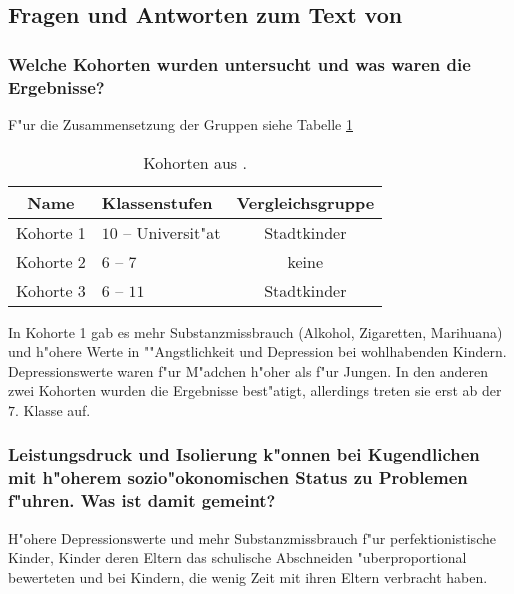 \subsection{Fragen und Antworten zum Text von \textcite{luthar_children_2005}}
\subsubsection{Welche Kohorten wurden untersucht und was waren die Ergebnisse?}

F"ur die Zusammensetzung der Gruppen siehe Tabelle \ref{tab:cohorts}
\begin{table}
        \centering
        \begin{tabular}{c | l | c}
                Name & Klassenstufen & Vergleichsgruppe\\
                \hline
                \hline
                Kohorte 1 & $10$ -- Universit"at & Stadtkinder\\
                Kohorte 2 & $6$ -- $7$ & keine \\
                Kohorte 3 & $6$ -- $11$ & Stadtkinder\\
                \hline
        \end{tabular}
        \caption{Kohorten aus \textcite{luthar_children_2005}.}
        \label{tab:cohorts}
\end{table}

In Kohorte 1 gab es mehr Substanzmissbrauch (Alkohol, Zigaretten, Marihuana) und h"ohere Werte in ""Angstlichkeit und Depression bei wohlhabenden Kindern. Depressionswerte waren f"ur M"adchen h"oher als f"ur Jungen. In den anderen zwei Kohorten wurden die Ergebnisse best"atigt, allerdings treten sie erst ab der $7.$ Klasse auf.

\subsubsection{Leistungsdruck und Isolierung k"onnen bei Kugendlichen mit h"oherem sozio"okonomischen Status zu Problemen f"uhren. Was ist damit gemeint?}
H"ohere Depressionswerte und mehr Substanzmissbrauch f"ur perfektionistische Kinder, Kinder deren Eltern das schulische Abschneiden "uberproportional bewerteten und bei Kindern, die wenig Zeit mit ihren Eltern verbracht haben.

